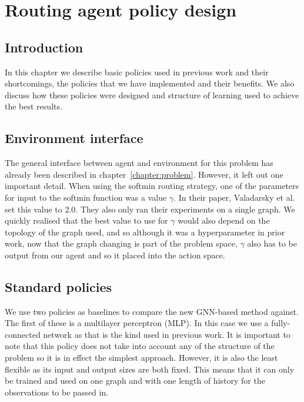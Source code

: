 \chapter{Routing agent policy design}
\label{chapter:learning}

 \section{Introduction}
In this chapter we describe basic policies used in previous work and their shortcomings, the policies that we have implemented and their benefits. We also discuss how these policies were designed and structure of learning used to achieve the best results.

\section{Environment interface}
The general interface between agent and environment for this problem has already been described in chapter~\ref{chapter:problem}. However, it left out one important detail. When using the softmin routing strategy, one of the parameters for input to the softmin function was a value $\gamma$. In their paper, Valadarsky et al.\cite{valadarsky2017learning} set this value to $2.0$. They also only ran their experiments on a single graph. We quickly realised that the best value to use for $\gamma$ would also depend on the topology of the graph used, and so although it was a hyperparameter in prior work, now that the graph changing is part of the problem space, $\gamma$ also has to be output from our agent and so it placed into the action space.

\section{Standard policies}
We use two policies as baselines to compare the new GNN-based method against. The first of these is a multilayer perceptron (MLP)\cite{rumelhart1986learning}. In this case we use a fully-connected network as that is the kind used in previous work. It is important to note that this policy does not take into account any of the structure of the problem so it is in effect the simplest approach. However, it is also the least flexible as its input and output sizes are both fixed. This means that it can only be trained and used on one graph and with one length of history for the observations to be passed in.

